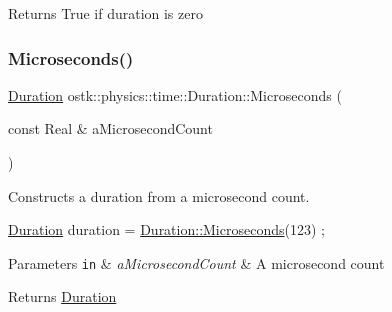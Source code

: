 \begin{DoxyReturn}{Returns}
True if duration is zero 
\end{DoxyReturn}
\mbox{\label{classostk_1_1physics_1_1time_1_1_duration_ab63d75db1524c35849385e07c0dc261a}} 
\subsubsection{\texorpdfstring{Microseconds()}{Microseconds()}}
{\footnotesize\ttfamily \hyperlink{classostk_1_1physics_1_1time_1_1_duration}{Duration} ostk\+::physics\+::time\+::\+Duration\+::\+Microseconds (\begin{DoxyParamCaption}\item[{const Real \&}]{a\+Microsecond\+Count }\end{DoxyParamCaption})\hspace{0.3cm}{\ttfamily [static]}}



Constructs a duration from a microsecond count. 


\begin{DoxyCode}
\hyperlink{classostk_1_1physics_1_1time_1_1_duration_a6ba3a020742ca6e3bf0b1970dd039c07}{Duration} duration = \hyperlink{classostk_1_1physics_1_1time_1_1_duration_ab63d75db1524c35849385e07c0dc261a}{Duration::Microseconds}(123) ;
\end{DoxyCode}



\begin{DoxyParams}[1]{Parameters}
\mbox{\tt in}  & {\em a\+Microsecond\+Count} & A microsecond count \\
\hline
\end{DoxyParams}
\begin{DoxyReturn}{Returns}
\hyperlink{classostk_1_1physics_1_1time_1_1_duration}{Duration} 
\end{DoxyReturn}
\mbox{\label{classostk_1_1physics_1_1time_1_1_duration_a0712e9c93f9be6ca4d837998fda90e7a}} 
